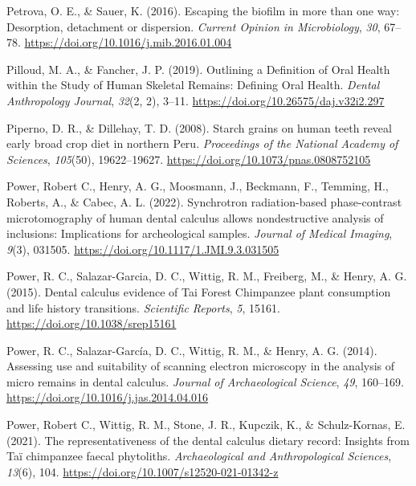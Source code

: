 \documentclass[
  letterpaper,
]{book}
\newlength{\cslhangindent}
\newlength{\cslentryspacingunit} %
\newenvironment{CSLReferences}[2] %
 {%
  \setlength{\parindent}{0pt}
  \ifodd #1
  \let\oldpar\par
  \def\par{\hangindent=\cslhangindent\oldpar}
  \fi
  \setlength{\parskip}{#2\cslentryspacingunit}
 }%
 {}
\begin{document}
\begin{CSLReferences}{1}{0}
\leavevmode{}%
Petrova, O. E., \& Sauer, K. (2016). Escaping the biofilm in more than
one way: Desorption, detachment or dispersion. \emph{Current Opinion in
Microbiology}, \emph{30}, 67--78.
\url{https://doi.org/10.1016/j.mib.2016.01.004}

\leavevmode{}%
Pilloud, M. A., \& Fancher, J. P. (2019). Outlining a {Definition} of
{Oral Health} within the {Study} of {Human Skeletal Remains}: {Defining
Oral Health}. \emph{Dental Anthropology Journal}, \emph{32}(2, 2),
3--11. \url{https://doi.org/10.26575/daj.v32i2.297}

\leavevmode{}%
Piperno, D. R., \& Dillehay, T. D. (2008). Starch grains on human teeth
reveal early broad crop diet in northern {Peru}. \emph{Proceedings of
the National Academy of Sciences}, \emph{105}(50), 19622--19627.
\url{https://doi.org/10.1073/pnas.0808752105}

\leavevmode{}%
Power, Robert C., Henry, A. G., Moosmann, J., Beckmann, F., Temming, H.,
Roberts, A., \& Cabec, A. L. (2022). Synchrotron radiation-based
phase-contrast microtomography of human dental calculus allows
nondestructive analysis of inclusions: Implications for archeological
samples. \emph{Journal of Medical Imaging}, \emph{9}(3), 031505.
\url{https://doi.org/10.1117/1.JMI.9.3.031505}

\leavevmode{}%
Power, R. C., Salazar-Garcia, D. C., Wittig, R. M., Freiberg, M., \&
Henry, A. G. (2015). Dental calculus evidence of {Tai Forest Chimpanzee}
plant consumption and life history transitions. \emph{Scientific
Reports}, \emph{5}, 15161. \url{https://doi.org/10.1038/srep15161}

\leavevmode{}%
Power, R. C., Salazar-García, D. C., Wittig, R. M., \& Henry, A. G.
(2014). Assessing use and suitability of scanning electron microscopy in
the analysis of micro remains in dental calculus. \emph{Journal of
Archaeological Science}, \emph{49}, 160--169.
\url{https://doi.org/10.1016/j.jas.2014.04.016}

\leavevmode{}%
Power, Robert C., Wittig, R. M., Stone, J. R., Kupczik, K., \&
Schulz-Kornas, E. (2021). The representativeness of the dental calculus
dietary record: Insights from {Taï} chimpanzee faecal phytoliths.
\emph{Archaeological and Anthropological Sciences}, \emph{13}(6), 104.
\url{https://doi.org/10.1007/s12520-021-01342-z}


\end{CSLReferences}
\end{document}
